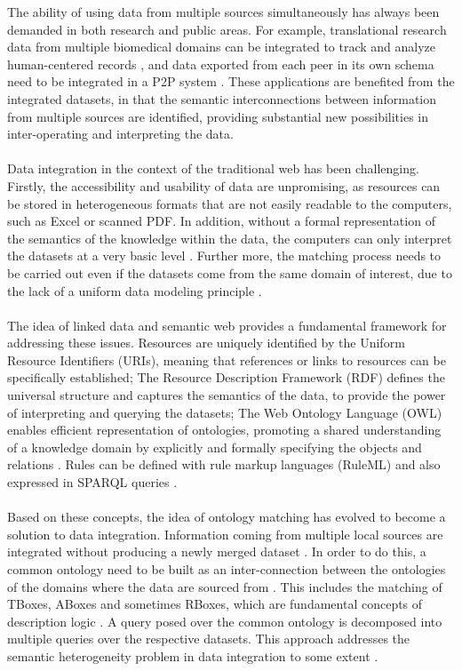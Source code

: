 \documentclass[a4paper,12pt,twoside]{article}
\begin{document}
The ability of using data from multiple sources simultaneously has always been demanded in both research and public areas. For example, translational research data from multiple biomedical domains can be integrated to track and analyze human-centered records \cite{wang2009translational}, and data exported from each peer in its own schema need to be integrated in a P2P system \cite{calvanese2003semantic}. These applications are benefited from the integrated datasets, in that the semantic interconnections between information from multiple sources are identified, providing substantial new possibilities in inter-operating and interpreting the data.
\\\\
Data integration in the context of the traditional web has been challenging. Firstly, the accessibility and usability of data are unpromising, as resources can be stored in heterogeneous formats that are not easily readable to the computers, such as Excel or scanned PDF. In addition, without a formal representation of the semantics of the knowledge within the data, the computers can only interpret the datasets at a very basic level \cite{shadbolt2006semantic}. Further more, the matching process needs to be carried out even if the datasets come from the same domain of interest, due to the lack of a uniform data modeling principle \cite{shvaiko2007ontology}.
\\\\
The idea of linked data and semantic web provides a fundamental framework for addressing these issues. Resources are uniquely identified by the Uniform Resource Identifiers (URIs), meaning that references or links to resources can be specifically established; The Resource Description Framework (RDF) defines the universal structure and captures the semantics of the data, to provide the power of interpreting and querying the datasets; The Web Ontology Language (OWL) enables efficient representation of ontologies, promoting a shared understanding of a knowledge domain by explicitly and formally specifying the objects and relations \cite{shadbolt2006semantic}. Rules can be defined with rule markup languages (RuleML) and also expressed in SPARQL queries \cite{polleres2007sparql}.
\\\\
Based on these concepts, the idea of ontology matching has evolved to become a solution to data integration. Information coming from multiple local sources are integrated without producing a newly merged dataset \cite{wache2001ontology}. In order to do this, a common ontology need to be built as an inter-connection between the ontologies of the domains where the data are sourced from \cite{shvaiko2007ontology}. This includes the matching of TBoxes, ABoxes and sometimes RBoxes, which are fundamental concepts of description logic \cite{baader2017introduction}. A query posed over the common ontology is decomposed into multiple queries over the respective datasets. This approach addresses the semantic heterogeneity problem in data integration to some extent \cite{vaishnavi2005semantic}.
\end{document}
